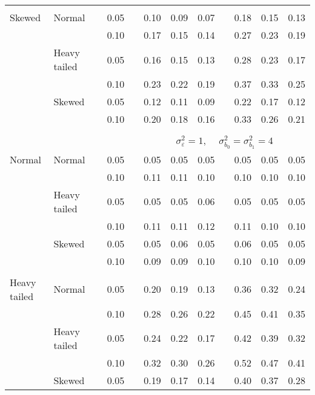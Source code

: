 \begin{table}[ht]
\begin{scriptsize}
\begin{center}
\begin{tabular}{ll p{.1cm} c p{.1cm} rrr p{.1cm} rrr}
             &&&&&&&&&&&\\
Skewed       & Normal       && 0.05 &&  0.10 & 0.09 & 0.07 && 0.18 & 0.15 & 0.13 \\ 
             &              && 0.10 &&  0.17 & 0.15 & 0.14 && 0.27 & 0.23 & 0.19 \\ 
             & Heavy tailed && 0.05 &&  0.16 & 0.15 & 0.13 && 0.28 & 0.23 & 0.17 \\ 
             &              && 0.10 &&  0.23 & 0.22 & 0.19 && 0.37 & 0.33 & 0.25 \\ 
             & Skewed       && 0.05 &&  0.12 & 0.11 & 0.09 && 0.22 & 0.17 & 0.12 \\ 
             &              && 0.10 &&  0.20 & 0.18 & 0.16 && 0.33 & 0.26 & 0.21 \\ 


&&&&&&&&&&&\\
& && && \multicolumn{7}{c}{$\sigma_{\varepsilon}^2 = 1$, \ \ $\sigma_{b_0}^2 = \sigma_{b_1}^2 = 4$} \\ \cline{6-12}
\rowcolor{gray!20}Normal       & Normal       && 0.05 &&  0.05 & 0.05 & 0.05 && 0.05 & 0.05 & 0.05 \\ 
\rowcolor{gray!20}             &              && 0.10 &&  0.11 & 0.11 & 0.10 && 0.10 & 0.10 & 0.10 \\ 
\rowcolor{gray!20}             & Heavy tailed && 0.05 &&  0.05 & 0.05 & 0.06 && 0.05 & 0.05 & 0.05 \\ 
\rowcolor{gray!20}             &              && 0.10 &&  0.11 & 0.11 & 0.12 && 0.11 & 0.10 & 0.10 \\ 
\rowcolor{gray!20}             & Skewed       && 0.05 &&  0.05 & 0.06 & 0.05 && 0.06 & 0.05 & 0.05 \\ 
\rowcolor{gray!20}             &              && 0.10 &&  0.09 & 0.09 & 0.10 && 0.10 & 0.10 & 0.09 \\ 
             &&&&&&&&&&&\\
Heavy tailed & Normal       && 0.05 &&  0.20 & 0.19 & 0.13 && 0.36 & 0.32 & 0.24 \\ 
             &              && 0.10 &&  0.28 & 0.26 & 0.22 && 0.45 & 0.41 & 0.35 \\ 
             & Heavy tailed && 0.05 &&  0.24 & 0.22 & 0.17 && 0.42 & 0.39 & 0.32 \\ 
             &              && 0.10 &&  0.32 & 0.30 & 0.26 && 0.52 & 0.47 & 0.41 \\ 
             & Skewed       && 0.05 &&  0.19 & 0.17 & 0.14 && 0.40 & 0.37 & 0.28 \\ 

\end{tabular}
\end{center}
\end{scriptsize}
\end{table}
